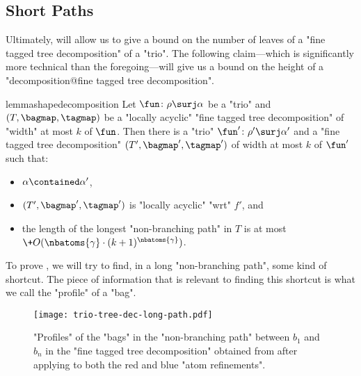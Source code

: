\subsection{{\AP}Short Paths}

Ultimately,  will allow us to give a bound on the number of
leaves of a "fine tagged tree decomposition" of a "trio". The following claim---which is 
significantly more technical than the foregoing---will give us a bound on the height of
a "decomposition@fine tagged tree decomposition".

\begin{restatable}{lemma}{shapedecomposition}
    \AP\label{lemma:shape-decomposition}
    Let $\fun\colon \rho \surj \alpha$ be a "trio" and $(T, \bagmap, \tagmap)$ be a "locally acyclic"
    "fine tagged tree decomposition" of "width" at most $k$ of $\fun$.
    Then there is a "trio" $\fun'\colon \rho' \surj \alpha'$ and a "fine tagged tree decomposition" $(T', \bagmap', \tagmap')$ of width at most $k$ of $\fun'$ such that:
    \begin{itemize}
        \item $\alpha \contained \alpha'$,
        \item $(T',\bagmap', \tagmap')$ is "locally acyclic" "wrt" $f'$, and
        \item the length of the longest "non-branching path" in $T$ is at most
        $\+O(\nbatoms{\gamma}\cdot (k+1)^{\nbatoms{\gamma}})$.
    \end{itemize}
\end{restatable}

\smallskip

To prove , we will try to find, in a long "non-branching path",
some kind of shortcut. The piece of information that is relevant to finding this shortcut
is what we call the "profile" of a "bag".

\begin{figure}[tbp]
	\centering
	\texttt{[image: trio-tree-dec-long-path.pdf]}
	\caption{
		\AP\label{fig:trio-tree-dec-long-path}
        "Profiles" of the "bags" in the "non-branching path" between $b_1$ and $b_n$ in the "fine tagged tree decomposition" obtained from  after applying 
		 to both the
		red and blue "atom refinements".
	}
\end{figure}

